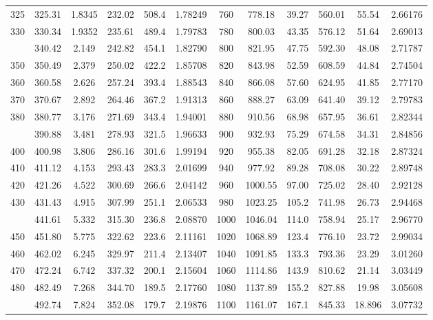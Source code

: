 \documentclass[12pt,a3paper]{article}
\begin{document}
\begin{enumerate}
\begin{center}
\begin{longtable}{cccccc|cccccc}
325 & 325.31 & 1.8345 & 232.02 & 508.4 & 1.78249 & 760 & 778.18 & 39.27 & 560.01 & 55.54 & 2.66176 \\
330 & 330.34 & 1.9352 & 235.61 & 489.4 & 1.79783 & 780 & 800.03 & 43.35 & 576.12 & 51.64 & 2.69013 \\
\addlinespace
340 & 340.42 & 2.149 & 242.82 & 454.1 & 1.82790 & 800 & 821.95 & 47.75 & 592.30 & 48.08 & 2.71787 \\
350 & 350.49 & 2.379 & 250.02 & 422.2 & 1.85708 & 820 & 843.98 & 52.59 & 608.59 & 44.84 & 2.74504 \\
360 & 360.58 & 2.626 & 257.24 & 393.4 & 1.88543 & 840 & 866.08 & 57.60 & 624.95 & 41.85 & 2.77170 \\
370 & 370.67 & 2.892 & 264.46 & 367.2 & 1.91313 & 860 & 888.27 & 63.09 & 641.40 & 39.12 & 2.79783 \\
380 & 380.77 & 3.176 & 271.69 & 343.4 & 1.94001 & 880 & 910.56 & 68.98 & 657.95 & 36.61 & 2.82344 \\
\addlinespace
390 & 390.88 & 3.481 & 278.93 & 321.5 & 1.96633 & 900 & 932.93 & 75.29 & 674.58 & 34.31 & 2.84856 \\
400 & 400.98 & 3.806 & 286.16 & 301.6 & 1.99194 & 920 & 955.38 & 82.05 & 691.28 & 32.18 & 2.87324 \\
410 & 411.12 & 4.153 & 293.43 & 283.3 & 2.01699 & 940 & 977.92 & 89.28 & 708.08 & 30.22 & 2.89748 \\
420 & 421.26 & 4.522 & 300.69 & 266.6 & 2.04142 & 960 & 1000.55 & 97.00 & 725.02 & 28.40 & 2.92128 \\
430 & 431.43 & 4.915 & 307.99 & 251.1 & 2.06533 & 980 & 1023.25 & 105.2 & 741.98 & 26.73 & 2.94468 \\
\addlinespace
440 & 441.61 & 5.332 & 315.30 & 236.8 & 2.08870 & 1000 & 1046.04 & 114.0 & 758.94 & 25.17 & 2.96770 \\
450 & 451.80 & 5.775 & 322.62 & 223.6 & 2.11161 & 1020 & 1068.89 & 123.4 & 776.10 & 23.72 & 2.99034 \\
460 & 462.02 & 6.245 & 329.97 & 211.4 & 2.13407 & 1040 & 1091.85 & 133.3 & 793.36 & 23.29 & 3.01260 \\
470 & 472.24 & 6.742 & 337.32 & 200.1 & 2.15604 & 1060 & 1114.86 & 143.9 & 810.62 & 21.14 & 3.03449 \\
480 & 482.49 & 7.268 & 344.70 & 189.5 & 2.17760 & 1080 & 1137.89 & 155.2 & 827.88 & 19.98 & 3.05608 \\
\addlinespace
490 & 492.74 & 7.824 & 352.08 & 179.7 & 2.19876 & 1100 & 1161.07 & 167.1 & 845.33 & 18.896 & 3.07732 \\

\end{longtable}
\end{center}
\end{enumerate}
\end{document}
